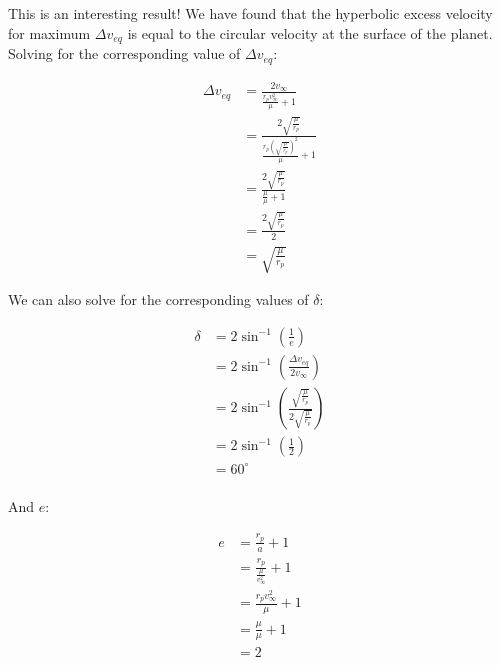 This is an interesting result! We have found that the hyperbolic excess velocity for maximum $\Delta v_{eq}$ is equal to the circular velocity at the surface of the planet. Solving for the corresponding value of $\Delta v_{eq}$:

\begin{align*}
    \Delta v_{eq} &= \frac{2 v_\infty}{\frac{r_p v_\infty^2}{\mu} + 1} \\
    &= \frac{2 \sqrt{\frac{\mu}{r_p}}}{\frac{r_p \left( \sqrt{\frac{\mu}{r_p}} \right)^2}{\mu} + 1} \\
    &= \frac{2 \sqrt{\frac{\mu}{r_p}}}{\frac{\mu}{\mu} + 1} \\
    &= \frac{2 \sqrt{\frac{\mu}{r_p}}}{2} \\
    &= \sqrt{\frac{\mu}{r_p}}
\end{align*}

We can also solve for the corresponding values of $\delta$:

\begin{align*}
    \delta &= 2 \sin^{-1} \left( \frac{1}{e} \right) \\
    &= 2 \sin^{-1} \left( \frac{\Delta v_{eq}}{2 v_\infty} \right) \\
    &= 2 \sin^{-1} \left( \frac{\sqrt{\frac{\mu}{r_p}}}{2 \sqrt{\frac{\mu}{r_p}}} \right) \\
    &= 2 \sin^{-1} \left( \frac{1}{2} \right) \\
    &= 60^\circ \\
\end{align*}

And $e$:

\begin{align*}
    e &= \frac{r_p}{a} + 1 \\
    &= \frac{r_p}{\frac{\mu}{v_\infty^2}} + 1 \\
    &= \frac{r_p v_\infty^2}{\mu} + 1 \\
    &= \frac{\mu}{\mu} + 1 \\
    &= 2
\end{align*}


